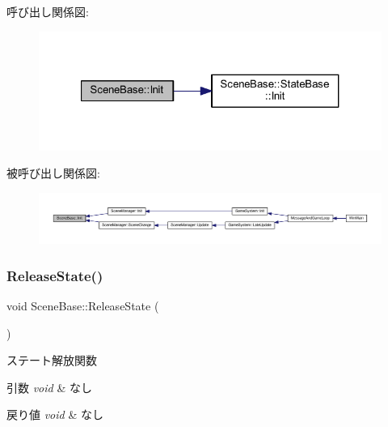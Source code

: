 呼び出し関係図\+:
\nopagebreak
\begin{figure}[H]
\begin{center}
\leavevmode
\includegraphics[width=321pt]{class_scene_base_a494ba624fdd95b296e4487ed1a34f47b_cgraph}
\end{center}
\end{figure}
被呼び出し関係図\+:
\nopagebreak
\begin{figure}[H]
\begin{center}
\leavevmode
\includegraphics[width=350pt]{class_scene_base_a494ba624fdd95b296e4487ed1a34f47b_icgraph}
\end{center}
\end{figure}
\mbox{\label{class_scene_base_aaa1e66fbfc6740b069d715b325915b97}} 
\subsubsection{\texorpdfstring{Release\+State()}{ReleaseState()}}
{\footnotesize\ttfamily void Scene\+Base\+::\+Release\+State (\begin{DoxyParamCaption}{ }\end{DoxyParamCaption})}



ステート解放関数 


\begin{DoxyParams}{引数}
{\em void} & なし \\
\hline
\end{DoxyParams}

\begin{DoxyRetVals}{戻り値}
{\em void} & なし \\
\hline
\end{DoxyRetVals}


